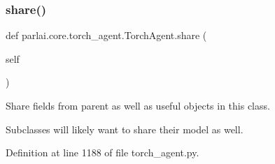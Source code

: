\subsubsection{\texorpdfstring{share()}{share()}}
{\footnotesize\ttfamily def parlai.\+core.\+torch\+\_\+agent.\+Torch\+Agent.\+share (\begin{DoxyParamCaption}\item[{}]{self }\end{DoxyParamCaption})}

\begin{DoxyVerb}Share fields from parent as well as useful objects in this class.

Subclasses will likely want to share their model as well.
\end{DoxyVerb}
 

Definition at line 1188 of file torch\+\_\+agent.\+py.



